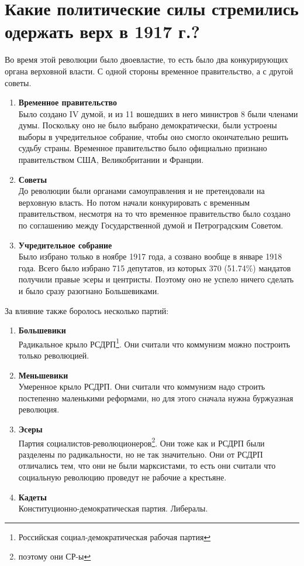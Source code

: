 \documentclass[12pt]{article}
\newcommand{\teal}[1]{{\color{teal}{#1}}}
\begin{document}
  \section{Какие политические силы стремились одержать верх в 1917 г.?}
  Во время этой революции было двоевластие, то есть было два конкурирующих органа верховной власти.
  С одной стороны временное правительство, а с другой советы.
  \begin{enumerate}[label=\textbf{\large\arabic*}]
    \item \textbf{\large Временное правительство} \\
    Было создано IV думой, и из 11 вошедших в него министров 8 были членами думы.
    Поскольку оно не было выбрано демократически, были устроены выборы в учредительное собрание, чтобы оно смогло окончательно решить судьбу страны.
    Временное правительство было официально признано правительством США, Великобритании и Франции.
    \item \textbf{\large Советы} \\
    До революции были органами самоуправления и не претендовали на верховную власть.
    Но потом начали конкурировать с временным правительством,
    несмотря на то что временное правительство было создано по соглашению между Государственной думой и Петроградским Советом.
    \item \textbf{\large Учредительное собрание} \\
    Было избрано только в ноябре 1917 года, а созвано вообще в январе 1918 года.
    Всего было избрано 715 депутатов, из которых 370 (51.74\%) мандатов получили правые эсеры и центристы.
    Поэтому оно не успело ничего сделать и было сразу разогнано Большевиками.
  \end{enumerate}

  За влияние также боролось несколько партий:
  \begin{enumerate}[label=\textbf{\large\arabic*}]
    \item \textbf{\large Большевики} \\
    Радикальное крыло РСДРП\footnote{Российская социал-демократическая рабочая партия}.
    Они считали что коммунизм можно построить только революцией.
    \item \textbf{\large Меньшевики} \\
    Умеренное крыло РСДРП. Они считали что коммунизм надо строить постепенно маленькими реформами, но для этого сначала нужна буржуазная революция.
    \item \textbf{\large Эсеры} \\
    Партия социалистов-революционеров\footnote{поэтому они СР-ы}.
    Они тоже как и РСДРП были разделены по радикальности, но не так значительно.
    Они от РСДРП отличались тем, что они не были марксистами, то есть они считали что социальную революцию проведут не рабочие а крестьяне.
    \item \textbf{\large Кадеты} \\
    Конституционно-демократическая партия. Либералы.
  \end{enumerate}
\end{document}
